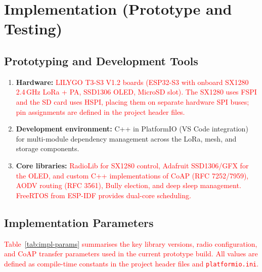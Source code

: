 \documentclass[12pt,a4paper]{article}
\newcommand{\changed}[1]{\textcolor{red}{#1}}
\begin{document}
\newpage


\section{Implementation (Prototype and Testing)}

\subsection{Prototyping and Development Tools}

\begin{enumerate}
    \item \textbf{Hardware:} \changed{LILYGO T3-S3 V1.2 boards (ESP32-S3 with onboard SX1280 2.4\,GHz LoRa + PA, SSD1306 OLED, MicroSD slot). The SX1280 uses FSPI and the SD card uses HSPI, placing them on separate hardware SPI buses; pin assignments are defined in the project header files.}
    \item \textbf{Development environment:} C++ in PlatformIO (VS Code integration) for multi-module dependency management across the LoRa, mesh, and storage components.
    \item \textbf{Core libraries:} \changed{RadioLib for SX1280 control, Adafruit SSD1306/GFX for the OLED, and custom C++ implementations of CoAP (RFC 7252/7959), AODV routing (RFC 3561), Bully election, and deep sleep management. FreeRTOS from ESP-IDF provides dual-core scheduling.}
\end{enumerate}

\subsection{Implementation Parameters}

\changed{Table~\ref{tab:impl-params} summarises the key library versions, radio configuration, and CoAP transfer parameters used in the current prototype build. All values are defined as compile-time constants in the project header files and \texttt{platformio.ini}.}
\end{document}

